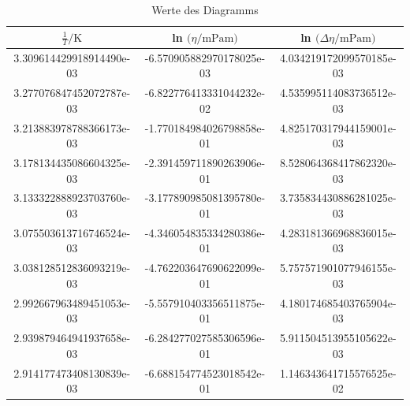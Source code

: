 \begin{table}
  \centering
  \caption{Werte des Diagramms}
  \begin{tabular}{S S S}
    \toprule
    $ \frac{1}{T} / \si{\kelvin} $ &
    ln $\text{(}\eta / \si{\milli\pascal\meter}\text{)}$  &
     ln $\text{(}\Delta \eta / \si{\milli\pascal\meter}\text{)}$  \\
    \midrule
         3.309614429918914490e-03 & -6.570905882970178025e-03 & 4.034219172099570185e-03\\
         3.277076847452072787e-03 & -6.822776413331044232e-02 & 4.535995114083736512e-03\\
         3.213883978788366173e-03 & -1.770184984026798858e-01 & 4.825170317944159001e-03\\
         3.178134435086604325e-03 & -2.391459711890263906e-01 & 8.528064368417862320e-03\\
         3.133322888923703760e-03 & -3.177890985081395780e-01 & 3.735834430886281025e-03\\
         3.075503613716746524e-03 & -4.346054835334280386e-01 & 4.283181366968836015e-03\\
         3.038128512836093219e-03 & -4.762203647690622099e-01 & 5.757571901077946155e-03\\
         2.992667963489451053e-03 & -5.557910403356511875e-01 & 4.180174685403765904e-03\\
         2.939879464941937658e-03 & -6.284277027585306596e-01 & 5.911504513955105622e-03\\
         2.914177473408130839e-03 & -6.688154774523018542e-01 & 1.146343641715576525e-02\\

     \bottomrule
  \end{tabular}
  \label{tab:plot}
\end{table}

